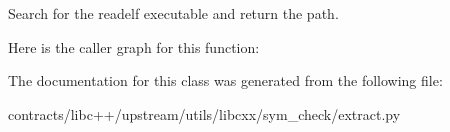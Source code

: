 \begin{DoxyVerb}Search for the readelf executable and return the path.
\end{DoxyVerb}
 Here is the caller graph for this function\+:


The documentation for this class was generated from the following file\+:\begin{DoxyCompactItemize}
\item 
contracts/libc++/upstream/utils/libcxx/sym\+\_\+check/extract.\+py\end{DoxyCompactItemize}

